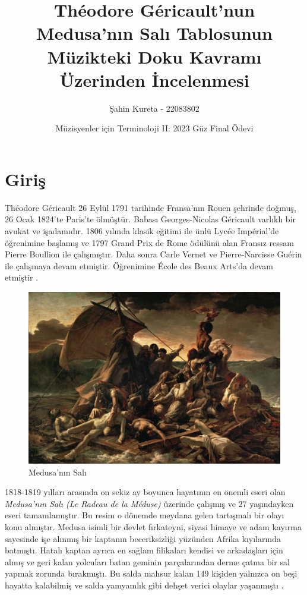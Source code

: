 \documentclass{report}
\title{Théodore Géricault'nun Medusa'nın Salı Tablosunun Müzikteki Doku Kavramı Üzerinden İncelenmesi}
\author{Şahin Kureta - 22083802}
\date{Müzisyenler için Terminoloji II: 2023 Güz Final Ödevi}
\begin{document}
\maketitle

\section*{Giriş}
Théodore Géricault 26 Eylül 1791 tarihinde Fransa'nın Rouen şehrinde doğmuş, 26 Ocak 1824'te Paris'te ölmüştür.
Babası Georges-Nicolas Géricault varlıklı bir avukat ve işadamıdır.
1806 yılında klasik eğitimi ile ünlü Lycée Impérial'de öğrenimine başlamış ve 1797 Grand Prix de Rome ödülünü alan Fransız ressam Pierre Boullion ile çalışmıştır.
Daha sonra Carle Vernet ve Pierre-Narcisse Guérin ile çalışmaya devam etmiştir.
Öğrenimine École des Beaux Arts'da devam etmiştir \citep{kronzek2023}.

\begin{figure}[htp]
    \centering
    \includegraphics[width=14cm]{medusa}
    \caption{Medusa'nın Salı}
    \label{fig:medusa}
\end{figure}

1818-1819 yılları arasında on sekiz ay boyunca hayatının en önemli eseri olan \textit{Medusa'nın Salı (Le Radeau de la Méduse)} üzerinde çalışmış ve 27 yaşındayken eseri tamamlamıştır.
Bu resim o dönemde meydana gelen tartışmalı bir olayı konu almıştır.
Medusa isimli bir devlet fırkateyni, siyasi himaye ve adam kayırma sayesinde işe alınmış bir kaptanın beceriksizliği yüzünden Afrika kıyılarında batmıştı.
Hatalı kaptan ayrıca en sağlam filikaları kendisi ve arkadaşları için almış ve geri kalan yolcuları batan geminin parçalarından derme çatma bir sal yapmak zorunda bırakmıştı.
Bu salda mahsur kalan 149 kişiden yalnızca on beşi hayatta kalabilmiş ve salda yamyamlık gibi dehşet verici olaylar yaşanmıştı \citep{kronzek2023}.
\end{document}
